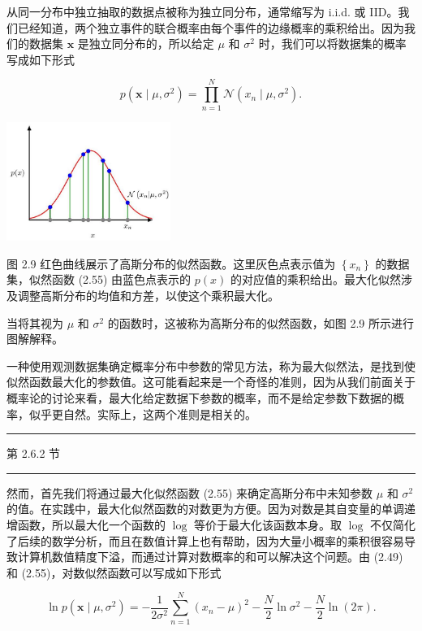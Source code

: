 \documentclass[10pt]{article}
\newcommand{\HRule}{\begin{center}\rule{0.9\linewidth}{0.2mm}\end{center}}
\begin{document}
从同一分布中独立抽取的数据点被称为独立同分布，通常缩写为 i.i.d. 或 IID。我们已经知道，两个独立事件的联合概率由每个事件的边缘概率的乘积给出。因为我们的数据集 \(\mathbf{x}\) 是独立同分布的，所以给定 \(\mu\) 和 \({\sigma }^{2}\) 时，我们可以将数据集的概率写成如下形式

\[
p\left( {\mathbf{x} \mid  \mu ,{\sigma }^{2}}\right)  = \mathop{\prod }\limits_{{n = 1}}^{N}\mathcal{N}\left( {{x}_{n} \mid  \mu ,{\sigma }^{2}}\right) . \tag{2.55}
\]

\begin{center}
\includegraphics[max width=0.4\textwidth]{images/0194e279-9b28-703a-88f4-c3ac21e2010d_57_941_344_607_442_0.jpg}
\end{center}
\hspace*{3em} 

图 2.9 红色曲线展示了高斯分布的似然函数。这里灰色点表示值为 \(\left\{  {x}_{n}\right\}\) 的数据集，似然函数 (2.55) 由蓝色点表示的 \(p\left( x\right)\) 的对应值的乘积给出。最大化似然涉及调整高斯分布的均值和方差，以使这个乘积最大化。

当将其视为 \(\mu\) 和 \({\sigma }^{2}\) 的函数时，这被称为高斯分布的似然函数，如图 2.9 所示进行图解解释。

一种使用观测数据集确定概率分布中参数的常见方法，称为最大似然法，是找到使似然函数最大化的参数值。这可能看起来是一个奇怪的准则，因为从我们前面关于概率论的讨论来看，最大化给定数据下参数的概率，而不是给定参数下数据的概率，似乎更自然。实际上，这两个准则是相关的。

\HRule

第 2.6.2 节

\HRule

然而，首先我们将通过最大化似然函数 (2.55) 来确定高斯分布中未知参数 \(\mu\) 和 \({\sigma }^{2}\) 的值。在实践中，最大化似然函数的对数更为方便。因为对数是其自变量的单调递增函数，所以最大化一个函数的 \(\log\) 等价于最大化该函数本身。取 \(\log\) 不仅简化了后续的数学分析，而且在数值计算上也有帮助，因为大量小概率的乘积很容易导致计算机数值精度下溢，而通过计算对数概率的和可以解决这个问题。由 (2.49) 和 (2.55)，对数似然函数可以写成如下形式

\[
\ln p\left( {\mathbf{x} \mid  \mu ,{\sigma }^{2}}\right)  =  - \frac{1}{2{\sigma }^{2}}\mathop{\sum }\limits_{{n = 1}}^{N}{\left( {x}_{n} - \mu \right) }^{2} - \frac{N}{2}\ln {\sigma }^{2} - \frac{N}{2}\ln \left( {2\pi }\right) . \tag{2.56}
\]
\end{document}
